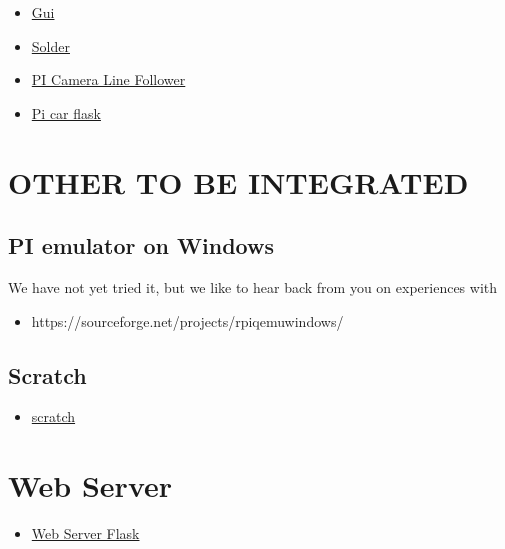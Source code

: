 \begin{itemize}
\tightlist
\item
  \href{https://www.raspberrypi.org/learning/getting-started-with-guis/worksheet/}{Gui}\\
\item
  \href{https://www.raspberrypi.org/learning/getting-started-with-guis/}{Solder}\\
\item
  \href{https://www.raspberrypi.org/blog/an-image-processing-robot-for-robocup-junior/}{PI
  Camera Line Follower}\\
\item
  \href{https://circuitdigest.com/microcontroller-projects/web-controlled-raspberry-pi-surveillance-robot}{Pi
  car flask}
\end{itemize}

\section{OTHER TO BE INTEGRATED}\label{other-to-be-integrated}

\subsection{PI emulator on Windows}\label{pi-emulator-on-windows}

We have not yet tried it, but we like to hear back from you on
experiences with

\begin{itemize}
\tightlist
\item
  https://sourceforge.net/projects/rpiqemuwindows/
\end{itemize}

\subsection{Scratch}\label{scratch}

\begin{itemize}
\tightlist
\item
  \href{https://github.com/DexterInd/GrovePi/tree/master/Software/Scratch}{scratch}
\end{itemize}

\section{Web Server}\label{web-server}

\begin{itemize}
\tightlist
\item
  \href{https://www.raspberrypi.org/learning/python-web-server-with-flask/worksheet/}{Web
  Server Flask}
\end{itemize}
